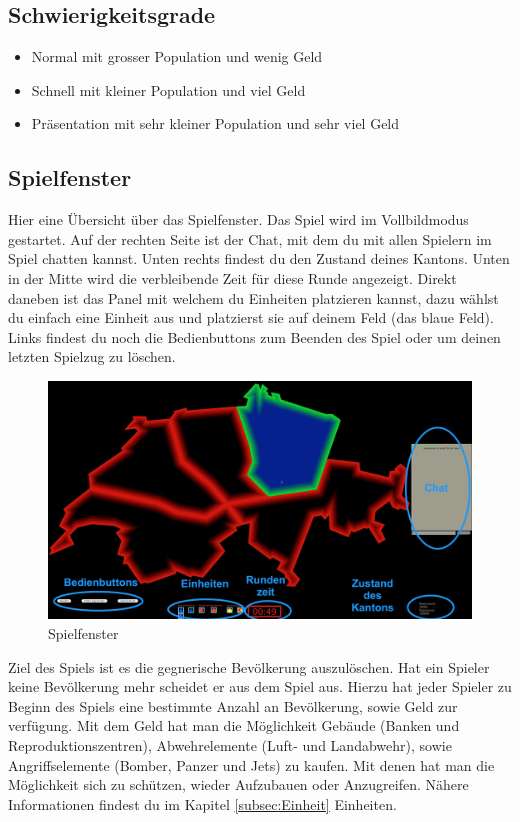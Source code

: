 \documentclass[ngerman, 12pt, pdftex]{scrartcl}[2006/07/30]
\begin{document}
\subsection{Schwierigkeitsgrade}
\begin{itemize}
\item Normal mit grosser Population und wenig Geld
\item Schnell mit kleiner Population und viel Geld
\item Präsentation mit sehr kleiner Population und sehr viel Geld
\end{itemize}

\subsection{Spielfenster}
Hier eine Übersicht über das Spielfenster. Das Spiel wird im Vollbildmodus gestartet. Auf der rechten Seite ist der Chat, mit dem du mit allen Spielern im Spiel chatten kannst.
Unten rechts findest du den Zustand deines Kantons. Unten in der Mitte wird die verbleibende Zeit für diese Runde angezeigt. 
Direkt daneben ist das Panel mit welchem du Einheiten platzieren kannst, dazu wählst du einfach eine Einheit aus und platzierst sie auf deinem Feld (das blaue Feld).
Links findest du noch die Bedienbuttons zum Beenden des Spiel oder um deinen letzten Spielzug zu löschen.
\begin{figure}[h]
\centering
\includegraphics[scale=0.15]{spiel/spielfenster.jpg}
\caption{Spielfenster}
\end{figure}


Ziel des Spiels ist es die gegnerische Bevölkerung auszulöschen. Hat ein Spieler keine Bevölkerung mehr scheidet er aus dem Spiel aus.
Hierzu hat jeder Spieler zu Beginn des Spiels eine bestimmte Anzahl an Bevölkerung, sowie Geld zur verfügung.
Mit dem Geld hat man die Möglichkeit Gebäude (Banken und Reproduktionszentren), Abwehrelemente (Luft- und Landabwehr), sowie Angriffselemente (Bomber, Panzer und Jets) zu kaufen. Mit denen hat man die Möglichkeit sich zu schützen, wieder Aufzubauen oder Anzugreifen. Nähere Informationen findest du im Kapitel \ref{subsec:Einheit} Einheiten.
\end{document}
